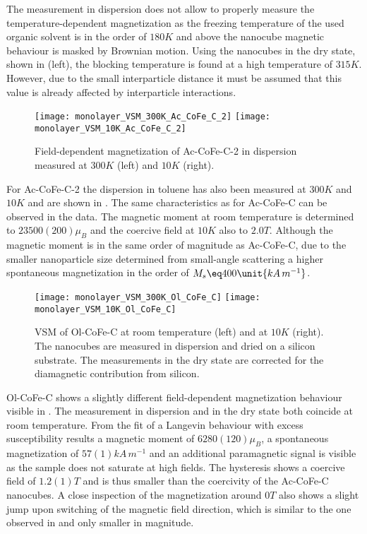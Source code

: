 \documentclass[\main/dresen_thesis.tex]{subfiles}
\begin{document}
  The measurement in dispersion does not allow to properly measure the temperature-dependent magnetization as the freezing temperature of the used organic solvent is in the order of $180 \unit{K}$ and above the nanocube magnetic behaviour is masked by Brownian motion.
  Using the nanocubes in the dry state, shown in  (left), the blocking temperature is found at a high temperature of $315 \unit{K}$.
  However, due to the small interparticle distance it must be assumed that this value is already affected by interparticle interactions.

  \begin{figure}[tb]
    \centering
    \texttt{[image: monolayer\_VSM\_300K\_Ac\_CoFe\_C\_2]}
    \texttt{[image: monolayer\_VSM\_10K\_Ac\_CoFe\_C\_2]}
    \caption{\label{fig:monolayers:nanoparticle:vsmAcCoFeC2}Field-dependent magnetization of Ac-CoFe-C-2 in dispersion measured at $300 \unit{K}$ (left) and $10 \unit{K}$ (right).}
  \end{figure}
  For Ac-CoFe-C-2 the dispersion in toluene has also been measured at $300 \unit{K}$ and $10 \unit{K}$ and are shown in .
  The same characteristics as for Ac-CoFe-C can be observed in the data.
  The magnetic moment at room temperature is determined to $23500(200) \mu_B$ and the coercive field at $10 \unit{K}$ also to $2.0 \unit{T}$.
  Although the magnetic moment is in the same order of magnitude as Ac-CoFe-C, due to the smaller nanoparticle size determined from small-angle scattering a higher spontaneous magnetization in the order of $M_s \eq 400 \unit{kA \, m^{-1}}$.

  \begin{figure}[tb]
    \centering
    \texttt{[image: monolayer\_VSM\_300K\_Ol\_CoFe\_C]}
    \texttt{[image: monolayer\_VSM\_10K\_Ol\_CoFe\_C]}
    \caption{\label{fig:monolayers:nanoparticle:vsmOlCoFeC}VSM of Ol-CoFe-C at room temperature (left) and at $10 \unit{K}$ (right). The nanocubes are measured in dispersion and dried on a silicon substrate. The measurements in the dry state are corrected for the diamagnetic contribution from silicon.}
  \end{figure}

  Ol-CoFe-C shows a slightly different field-dependent magnetization behaviour visible in .
  The measurement in dispersion and in the dry state both coincide at room temperature.
  From the fit of a Langevin behaviour with excess susceptibility results a magnetic moment of $6280(120) \mu_B$, a spontaneous magnetization of $57(1) \unit{kA \, m^{-1}}$ and an additional paramagnetic signal is visible as the sample does not saturate at high fields.
  The hysteresis shows a coercive field of $1.2(1) \unit{T}$ and is thus smaller than the coercivity of the Ac-CoFe-C nanocubes.
  A close inspection of the magnetization around $0 \unit{T}$ also shows a slight jump upon switching of the magnetic field direction, which is similar to the one observed in  and only smaller in magnitude.
\end{document}
